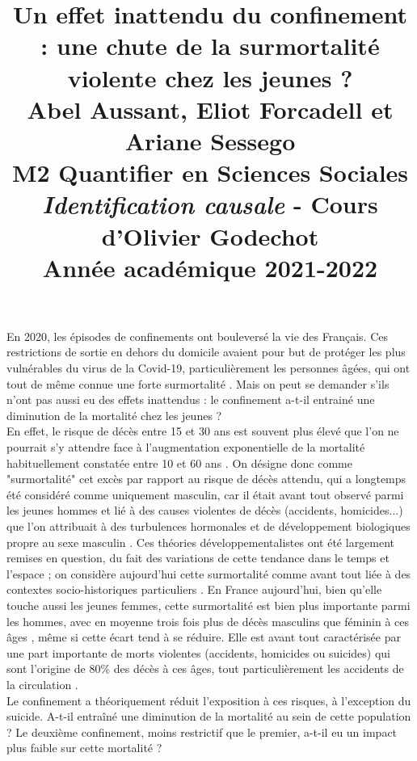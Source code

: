 \documentclass[titlepage]{article}
\title{\centering 

\vspace{1 cm}

{\begin{minipage}\linewidth
        \centering
     \textbf{Un effet inattendu du confinement : une chute de la surmortalité violente chez les jeunes ?} \\[1 cm] 
        \vspace{0.5cm}
        \large Abel Aussant, Eliot Forcadell et Ariane Sessego\\
         M2 Quantifier en Sciences Sociales\\
        \vspace{0.5cm}
         \textit{Identification causale} - Cours d'Olivier Godechot \\
         Année académique 2021-2022\\
    \end{minipage}}
  }
\date{}
\begin{document}


\maketitle

\cleardoublepage%

En 2020, les épisodes de confinements ont bouleversé la vie des Français. Ces restrictions de sortie en dehors du domicile avaient pour but de protéger les plus vulnérables du virus de la Covid-19, particulièrement les personnes âgées, qui ont tout de même connue une forte surmortalité \parencite{breton_levolution_2022,pison_covid-19_2022,papon_bilan_2021}. Mais on peut se demander s'ils n'ont pas aussi eu des effets inattendus : le confinement a-t-il entrainé une diminution de la mortalité chez les jeunes ? \\

En effet, le risque de décès entre 15 et 30 ans est souvent plus élevé que l'on ne pourrait s'y attendre face à l'augmentation exponentielle de la mortalité habituellement constatée entre 10 et 60 ans \parencite{remund_surmortalite_2021}. On désigne donc comme "surmortalité" cet excès par rapport au risque de décès attendu, qui a longtemps été considéré comme uniquement masculin, car il était avant tout observé parmi les jeunes hommes et lié à des causes violentes de décès (accidents, homicides...) que l'on attribuait à des turbulences hormonales et de développement biologiques propre au sexe masculin \parencite{heligman_age_1980,goldstein_secular_2011}. Ces théories développementalistes ont été largement remises en question, du fait des variations de cette tendance dans le temps et l'espace ; on considère aujourd'hui cette surmortalité comme avant tout liée à des contextes socio-historiques particuliers \parencite{remund_surmortalite_2021}. En France aujourd'hui, bien qu'elle touche aussi les jeunes femmes, cette surmortalité est bien plus importante parmi les hommes, avec en moyenne trois fois plus de décès masculins que féminin à ces âges \parencite{breton_levolution_2019, pison_france_2021}, même si cette écart tend à se réduire. Elle est avant tout caractérisée par une part importante de morts violentes (accidents, homicides ou suicides) qui sont l'origine de 80\% des décès à ces âges, tout particulièrement les accidents de la circulation \parencite{remund_surmortalite_2021}. \\

Le confinement a théoriquement réduit l'exposition à ces risques, à l'exception du suicide. A-t-il entraîné une diminution de la mortalité au sein de cette population ? Le deuxième confinement, moins restrictif que le premier, a-t-il eu un impact plus faible sur cette mortalité ? \\
\end{document}
